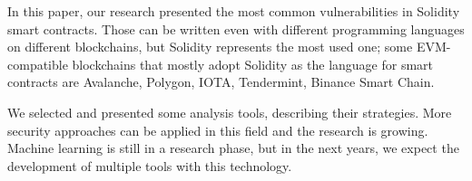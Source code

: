 \documentclass[a4paper,sigconf, language=french,
language=german, language=spanish, language=english]{acmart}
\begin{document}
In this paper, our research presented the most common vulnerabilities in Solidity smart contracts. Those can be written even with different programming languages on different blockchains, but Solidity represents the most used one; some EVM-compatible blockchains that mostly adopt Solidity as the language for smart contracts are Avalanche, Polygon, IOTA, Tendermint, Binance Smart Chain.

We selected and presented some analysis tools, describing their strategies. More security approaches can be applied in this field and the research is growing. Machine learning is still in a research phase, but in the next years, we expect the development of multiple tools with this technology.




\end{document}
